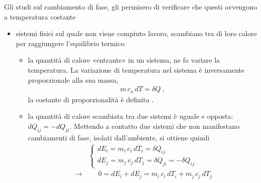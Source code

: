 \documentclass[letterpaper,10pt,italian]{jupyterBook}
\begin{document}
\sphinxAtStartPar
Gli studi sul cambiamento di fase, gli permisero di verificare che questi avvengono a temperatura costante
\begin{itemize}
\item {} 
\sphinxAtStartPar
sistemi fisici sul quale non viene compiuto lavoro, scambiano tra di loro calore per raggiungere l’equilibrio termico
\begin{itemize}
\item {} 
\sphinxAtStartPar
la quantità di calore «entrante» in un sistema, ne fa variare la temperatura. La variazione di temperatura nel sistema è inversamente proporzionale alla sua massa,
\begin{equation*}
\begin{split}m \, c_x \, d T = \delta Q \ ,\end{split}
\end{equation*}
\sphinxAtStartPar
la costante di proporzionalità è definita .  

\item {} 
\sphinxAtStartPar
la quantità di calore scambiata tra due sistemi è uguale e opposta: \(d Q_{ij} = - d Q_{ji}\).
Mettendo a contatto due sistemi che non manifestano cambiamenti di fase, isolati dall’ambiente, si ottiene quindi
\begin{equation*}
\begin{split}\begin{cases}
      d E_i = m_i \, c_i \, d T_i = \delta Q_{ij} \\
      d E_j = m_j \, c_j \, d T_j = \delta Q_{ji} = - \delta Q_{ij}
    \end{cases}
    \end{split}
\end{equation*}\begin{equation*}
\begin{split}\rightarrow \qquad 0 = d E_i + d E_j = m_i \, c_i \, d T_i + m_j \, c_j \, d T_j\end{split}
\end{equation*}
\sphinxAtStartPar
{} 

\end{itemize}


\end{itemize}
\end{document}
